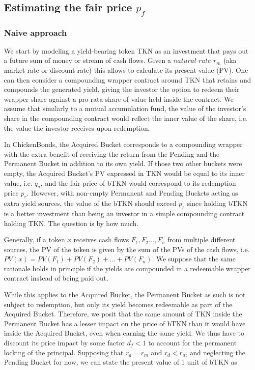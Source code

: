 \documentclass{article}
\begin{document}
\subsection{Estimating the fair price $p_f$}
\subsubsection{Naive approach}
We start by modeling a yield-bearing token TKN as an investment that pays out a future sum of money or stream of cash flows. Given a $\textit{natural rate}$ $r_m$ (aka market rate or discount rate) this allows to calculate its present value (PV). One can then consider a compounding wrapper contract around TKN that retains and compounds the generated yield, giving the investor the option to redeem their wrapper share against a pro rata share of value held inside the contract. We assume that similarly to a mutual accumulation fund, the value of the investor's share in the compounding contract would reflect the inner value of the share, i.e. the value the investor receives upon redemption. 

In ChickenBonds, the Acquired Bucket corresponds to a compounding wrapper with the extra benefit of receiving the return from the Pending and the Permanent Bucket in addition to its own yield. If those two other buckets were empty, the Acquired Bucket's PV expressed in TKN would be equal to its inner value, i.e. $q_a$, and the fair price of bTKN would correspond to its redemption price $p_r$. However, with non-empty Permanent and Pending Buckets acting as extra yield sources, the value of the bTKN should exceed $p_r$ since holding bTKN is a better investment than being an investor in a simple compounding contract holding TKN. The question is by how much.

Generally, if a token $x$ receives cash flows $F_1, F_2..., F_n$ from multiple different sources, the PV of the token is given by the sum of the PVs of the cash flows, i.e. $PV(x) = PV(F_1) + PV(F_2) + ... + PV(F_n)$. We suppose that the same rationale holds in principle if the yields are compounded in a redeemable wrapper contract instead of being paid out. 

While this applies to the Acquired Bucket, the Permanent Bucket as such is not subject to redemption, but only its yield becomes redeemable as part of the Acquired Bucket. Therefore, we posit that the same amount of TKN inside the Permanent Bucket has a lesser impact on the price of bTKN than it would have inside the Acquired Bucket, even when earning the same yield. We thus have to discount its price impact by some factor $d_f < 1$ to account for the permanent locking of the principal. Supposing that $r_a = r_m$ and $r_d < r_a$, and neglecting the Pending Bucket for now, we can state the present value of 1 unit of bTKN as
\end{document}
